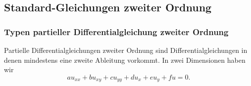 \begin{auf}\chc\label{block10A1}

\end{auf}
\begin{auf}\chc\label{block10A2}

\end{auf}
\begin{auf}\chd\label{block10A2a}

\end{auf}
\subsection{Standard-Gleichungen zweiter Ordnung}
\subsubsection{Typen partieller Differentialgleichung zweiter Ordnung}

Partielle Differentialgleichungen zweiter Ordnung sind Differentialgleichungen in denen mindestens eine zweite Ableitung vorkommt. In zwei Dimensionen haben wir 
$$ a u_{xx}+ bu_{xy}+c u_{yy} + du_x+e u_y+f u = 0.$$

